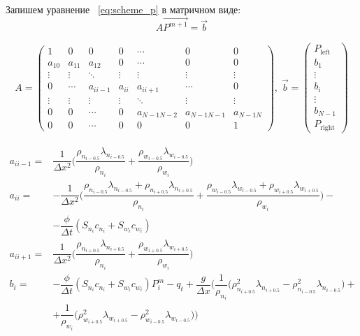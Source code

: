 Запишем уравнение ~\eqref{eq:scheme_p} в матричном виде:
\begin{equation} \label{eq:scheme_p_matrix}
A\overrightarrow{P^{m+1}} = \vec{b}
\end{equation}

\begin{equation} \label{eq:p_matrix}
\begin{aligned}
A = \begin{pmatrix}
1 & 0 & 0 & 0 & \cdots & 0 & 0 \\
a_{10} & a_{11} & a_{12} & 0 & \cdots & 0 & 0 \\
\vdots & \vdots & \ddots & \vdots & \vdots & \vdots & \vdots \\
0 & \cdots & a_{ii-1} & a_{ii} & a_{ii+1} & \cdots & 0 \\
\vdots & \vdots & \vdots & \vdots & \ddots & \vdots & \vdots\\
0 & 0 & \cdots & 0 & a_{N-1 N-2} & a_{N-1 N-1} & a_{N-1 N} \\
0 & 0 & \cdots & 0 & 0 & 0 & 1
\end{pmatrix}, \;
\vec{b} = \begin{pmatrix}
P_{\text{left}} \\
b_1 \\
\vdots \\
b_i \\
\vdots \\
b_{N-1} \\
P_{\text{right}}
\end{pmatrix}
\end{aligned}
\end{equation}

\begin{equation} \label{eq:p_matrix_i}
\begin{aligned}
a_{ii-1} = & \dfrac{1}{\Delta x^2} \big(\dfrac{\rho_{n_{i-0.5}} \lambda_{n_{i-0.5}}}{\rho_{n_i}} + \dfrac{\rho_{w_{i-0.5}} \lambda_{w_{i-0.5}}}{\rho_{w_i}} \big) \\
a_{ii} = & -\dfrac{1}{\Delta x^2} \big(\dfrac{\rho_{n_{i-0.5}} \lambda_{n_{i-0.5}} + \rho_{n_{i+0.5}} \lambda_{n_{i+0.5}}}{\rho_{n_i}} 
+ \dfrac{\rho_{w_{i-0.5}} \lambda_{w_{i-0.5}} + \rho_{w_{i+0.5}} \lambda_{w_{i+0.5}}}{\rho_{w_i}} \big) - \\
& - \dfrac{\phi}{\Delta t} (S_{n_i}c_{n_i}+S_{w_i}c_{w_i}) \\
a_{ii+1} = & \dfrac{1}{\Delta x^2} \big(\dfrac{\rho_{n_{i+0.5}} \lambda_{n_{i+0.5}}}{\rho_{n_i}} + \dfrac{\rho_{w_{i+0.5}} \lambda_{w_{i+0.5}}}{\rho_{w_i}} \big) \\
b_i = & - \dfrac{\phi}{\Delta t} (S_{n_i}c_{n_i}+S_{w_i}c_{w_i})P_i^m - q_t + \dfrac{g}{\Delta x} \bigg(\dfrac{1}{\rho_{n_i}} \big( \rho_{n_{i+0.5}}^2 \lambda_{n_{i+0.5}} 
  - \rho_{n_{i-0.5}}^2 \lambda_{n_{i-0.5}} \big) + \\
  &+ \dfrac{1}{\rho_{w_i}} \big( \rho_{w_{i+0.5}}^2 \lambda_{w_{i+0.5}} 
  - \rho_{w_{i-0.5}}^2 \lambda_{w_{i-0.5}} \big)\bigg)
\end{aligned}
\end{equation}

